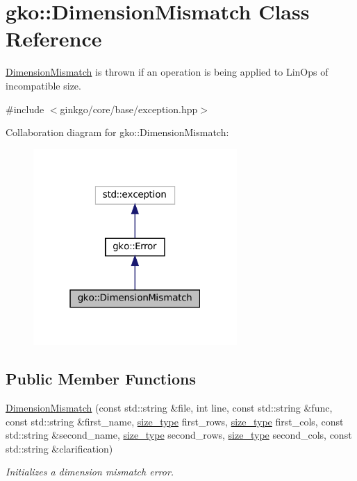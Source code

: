 \hypertarget{classgko_1_1DimensionMismatch}{}\section{gko\+:\+:Dimension\+Mismatch Class Reference}
\label{classgko_1_1DimensionMismatch}


\hyperlink{classgko_1_1DimensionMismatch}{Dimension\+Mismatch} is thrown if an operation is being applied to Lin\+Ops of incompatible size.  




{\ttfamily \#include $<$ginkgo/core/base/exception.\+hpp$>$}



Collaboration diagram for gko\+:\+:Dimension\+Mismatch\+:
\nopagebreak
\begin{figure}[H]
\begin{center}
\leavevmode
\includegraphics[width=220pt]{classgko_1_1DimensionMismatch__coll__graph}
\end{center}
\end{figure}
\subsection*{Public Member Functions}
\begin{DoxyCompactItemize}
\item 
\hyperlink{classgko_1_1DimensionMismatch_ae9ece719cbd41a39835655ba3e70aa47}{Dimension\+Mismatch} (const std\+::string \&file, int line, const std\+::string \&func, const std\+::string \&first\+\_\+name, \hyperlink{namespacegko_a6e5c95df0ae4e47aab2f604a22d98ee7}{size\+\_\+type} first\+\_\+rows, \hyperlink{namespacegko_a6e5c95df0ae4e47aab2f604a22d98ee7}{size\+\_\+type} first\+\_\+cols, const std\+::string \&second\+\_\+name, \hyperlink{namespacegko_a6e5c95df0ae4e47aab2f604a22d98ee7}{size\+\_\+type} second\+\_\+rows, \hyperlink{namespacegko_a6e5c95df0ae4e47aab2f604a22d98ee7}{size\+\_\+type} second\+\_\+cols, const std\+::string \&clarification)
\begin{DoxyCompactList}\small\item\em Initializes a dimension mismatch error. \end{DoxyCompactList}\end{DoxyCompactItemize}


